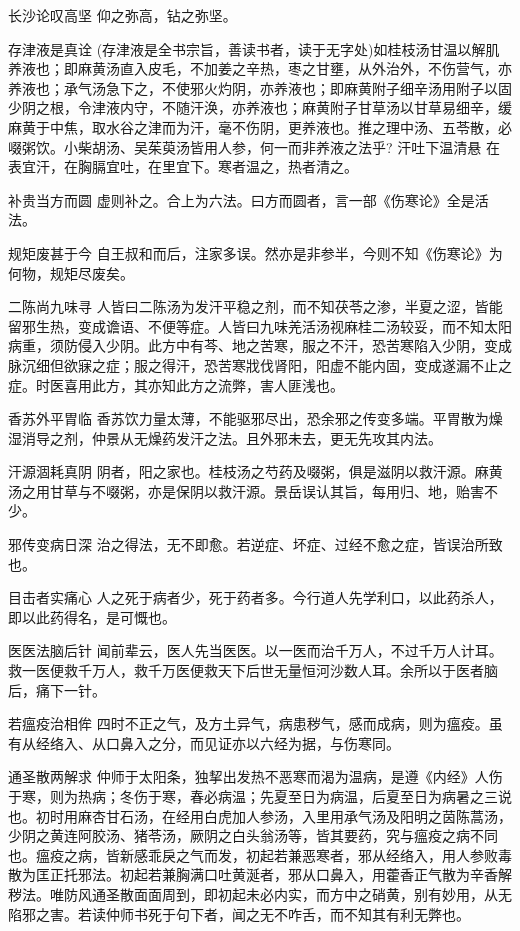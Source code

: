 \documentclass[a4paper,12pt,UTF8,twoside]{ctexbook}
\begin{document}
    长沙论叹高坚
    仰之弥高，钻之弥坚。
    
    存津液是真诠
    (存津液是全书宗旨，善读书者，读于无字处)如桂枝汤甘温以解肌养液也；即麻黄汤直入皮毛，不加姜之辛热，枣之甘壅，从外治外，不伤营气，亦养液也；承气汤急下之，不使邪火灼阴，亦养液也；即麻黄附子细辛汤用附子以固少阴之根，令津液内守，不随汗涣，亦养液也；麻黄附子甘草汤以甘草易细辛，缓麻黄于中焦，取水谷之津而为汗，毫不伤阴，更养液也。推之理中汤、五苓散，必啜粥饮。小柴胡汤、吴茱萸汤皆用人参，何一而非养液之法乎?
    汗吐下温清悬
    在表宜汗，在胸膈宜吐，在里宜下。寒者温之，热者清之。
    
    补贵当方而圆
    虚则补之。合上为六法。曰方而圆者，言一部《伤寒论》全是活法。
    
    规矩废甚于今
    自王叔和而后，注家多误。然亦是非参半，今则不知《伤寒论》为何物，规矩尽废矣。
    
    二陈尚九味寻
    人皆曰二陈汤为发汗平稳之剂，而不知茯苓之渗，半夏之涩，皆能留邪生热，变成谵语、不便等症。人皆曰九味羌活汤视麻桂二汤较妥，而不知太阳病重，须防侵入少阴。此方中有芩、地之苦寒，服之不汗，恐苦寒陷入少阴，变成脉沉细但欲寐之症；服之得汗，恐苦寒戕伐肾阳，阳虚不能内固，变成遂漏不止之症。时医喜用此方，其亦知此方之流弊，害人匪浅也。
    
    香苏外平胃临
    香苏饮力量太薄，不能驱邪尽出，恐余邪之传变多端。平胃散为燥湿消导之剂，仲景从无燥药发汗之法。且外邪未去，更无先攻其内法。
    
    汗源涸耗真阴
    阴者，阳之家也。桂枝汤之芍药及啜粥，俱是滋阴以救汗源。麻黄汤之用甘草与不啜粥，亦是保阴以救汗源。景岳误认其旨，每用归、地，贻害不少。
    
    邪传变病日深
    治之得法，无不即愈。若逆症、坏症、过经不愈之症，皆误治所致也。
    
    目击者实痛心
    人之死于病者少，死于药者多。今行道人先学利口，以此药杀人，即以此药得名，是可慨也。
    
    医医法脑后针
    闻前辈云，医人先当医医。以一医而治千万人，不过千万人计耳。救一医便救千万人，救千万医便救天下后世无量恒河沙数人耳。余所以于医者脑后，痛下一针。
    
    若瘟疫治相侔
    四时不正之气，及方土异气，病患秽气，感而成病，则为瘟疫。虽有从经络入、从口鼻入之分，而见证亦以六经为据，与伤寒同。
    
    通圣散两解求
    仲师于太阳条，独挈出发热不恶寒而渴为温病，是遵《内经》人伤于寒，则为热病；冬伤于寒，春必病温；先夏至日为病温，后夏至日为病暑之三说也。初时用麻杏甘石汤，在经用白虎加人参汤，入里用承气汤及阳明之茵陈蒿汤，少阴之黄连阿胶汤、猪苓汤，厥阴之白头翁汤等，皆其要药，究与瘟疫之病不同也。瘟疫之病，皆新感乖戾之气而发，初起若兼恶寒者，邪从经络入，用人参败毒散为匡正托邪法。初起若兼胸满口吐黄涎者，邪从口鼻入，用藿香正气散为辛香解秽法。唯防风通圣散面面周到，即初起未必内实，而方中之硝黄，别有妙用，从无陷邪之害。若读仲师书死于句下者，闻之无不咋舌，而不知其有利无弊也。
    
\end{document}
